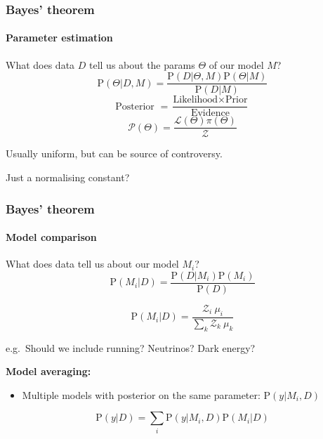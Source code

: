 \documentclass[%
]{beamer}
\newcommand{\lik}{\mathcal{L}}
\newcommand{\posterior}{\mathcal{P}}
\newcommand{\prior}{\pi}
\newcommand{\ev}{\mathcal{Z}}
\newcommand{\prob}{\mathrm{P}}
\begin{document}
\begin{frame}
  \frametitle{Bayes' theorem}
  \framesubtitle{Parameter estimation}

  What does data $D$ tell us about the params $\Theta$ of our model $M$?
  \[\prob(\Theta|D,M) = \frac{\prob(D|\Theta,M) \prob(\Theta|M) }{ \prob(D|M) }\] 
  \[\text{Posterior } = \frac{\text{Likelihood} \times \text{Prior} } {\text{Evidence} }\] 
  \[ \posterior(\Theta)= \frac{\lik(\Theta) \prior(\Theta)} {\ev}\] 
  \begin{description}
          \pause\item[Prior:] Usually uniform, but can be source of controversy.
      \pause\item[Evidence:] Just a normalising constant\pause?
  \end{description}

\end{frame}

\begin{frame}
  \frametitle{Bayes' theorem}
  \framesubtitle{Model comparison}
  \pause
  What does data tell us about our model $M_i$?
  \pause
    \[\prob(M_i|D) = \frac{\prob(D|M_i) \prob(M_i) }{ \prob(D) }\] 

  \pause
    \[\prob(M_i|D) = \frac{\ev_i \: \mu_i}{\sum_k \ev_k \: \mu_k}\] 

  \pause
  e.g.\ Should we include running? \pause Neutrinos? \pause Dark energy?

  \pause
  \textbf{Model averaging:}
  \begin{itemize}
        \item Multiple models with posterior on the same parameter: ${\prob(y|M_i,D)}$
  \end{itemize}
  \[\prob(y|D) = \sum_i \prob(y|M_i,D) \prob(M_i|D)\]


\end{frame}
\end{document}
